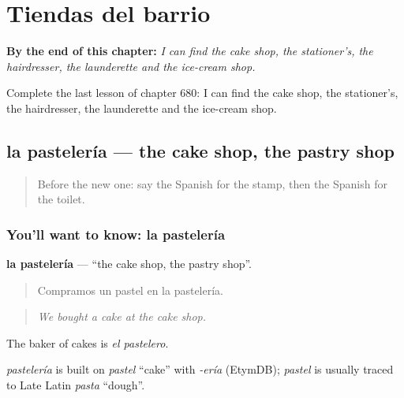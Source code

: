 
\chapter{Tiendas del barrio}
\label{ch:es-tiendas-del-barrio}

\begin{chapteropening}
\textbf{By the end of this chapter:} \emph{I can find the cake shop, the stationer’s, the hairdresser, the launderette and the ice-cream shop.}

Complete the last lesson of chapter 680: I can find the cake shop, the stationer’s, the hairdresser, the launderette and the ice-cream shop.
\end{chapteropening}

\section[la pastelería]{la pastelería — the cake shop, the pastry shop}

\label{lesson:ES-C680-pasteleria}



\begin{quote}
Before the new one: say the Spanish for the stamp, then the Spanish for the toilet.
\end{quote}

\subsection*{You'll want to know: la pastelería}
\textbf{la pastelería} — \textquotedblleft{}the cake shop, the pastry shop\textquotedblright{}.

\begin{quote}
Compramos un pastel en la pastelería.
\end{quote}

\begin{quote}
\emph{We bought a cake at the cake shop.}
\end{quote}

The baker of cakes is \emph{el pastelero}.

\begin{cousinweb}
\emph{pastelería} is built on \emph{pastel} \textquotedblleft{}cake\textquotedblright{} with \emph{-ería} (EtymDB); \emph{pastel} is usually traced to Late Latin \emph{pasta} \textquotedblleft{}dough\textquotedblright{}.
\end{cousinweb}

